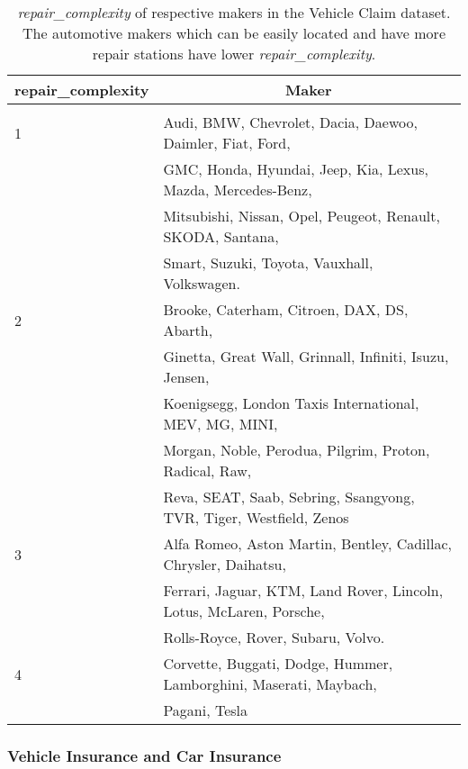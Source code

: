 \documentclass{article}
\begin{document}
\begin{table}[htbp]
\caption{\textit{repair\_complexity} of respective makers in the Vehicle Claim dataset. The automotive makers which can be easily located and have more repair stations have lower \textit{repair\_complexity}.}
\label{tab:2}
\begin{center}
\begin{tabular}{ll}
\multicolumn{1}{c}{\bf repair\_complexity}  &\multicolumn{1}{c}{\bf Maker}
\\ \hline \\
1             & Audi, BMW, Chevrolet, Dacia, Daewoo, Daimler, Fiat, Ford,\\
              &GMC, Honda, Hyundai, Jeep, Kia, Lexus, Mazda, Mercedes-Benz, \\
              &Mitsubishi, Nissan, Opel, Peugeot, Renault, SKODA, Santana,\\
               & Smart, Suzuki, Toyota, Vauxhall, Volkswagen. \\ \hline
2               & Brooke, Caterham, Citroen, DAX, DS, Abarth,\\
                &Ginetta, Great Wall, Grinnall, Infiniti, Isuzu, Jensen,\\
                &Koenigsegg, London Taxis International, MEV, MG, MINI,\\
                &Morgan, Noble, Perodua, Pilgrim, Proton, Radical, Raw,\\
                &Reva, SEAT, Saab, Sebring, Ssangyong, TVR, Tiger, Westfield, Zenos\\\hline
3              &Alfa Romeo, Aston Martin, Bentley, Cadillac, Chrysler, Daihatsu,\\
                &Ferrari, Jaguar, KTM, Land Rover, Lincoln, Lotus, McLaren, Porsche,\\
                &Rolls-Royce, Rover, Subaru, Volvo.\\\hline
4               &Corvette, Buggati, Dodge, Hummer, Lamborghini, Maserati, Maybach, \\
                &Pagani, Tesla

\end{tabular}
\end{center}
\end{table}




\subsubsection{Vehicle Insurance and Car Insurance}
\end{document}
